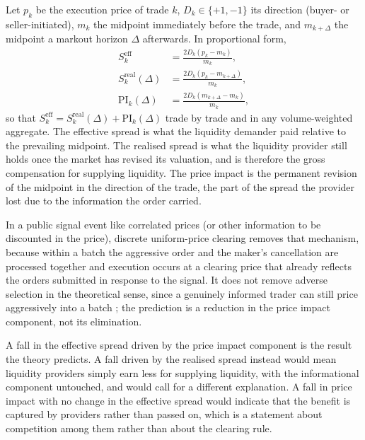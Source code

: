 Let $p_k$ be the execution price of trade $k$, $D_k \in \{+1,-1\}$ its
direction (buyer- or seller-initiated), $m_k$ the midpoint immediately
before the trade, and $m_{k+\Delta}$ the midpoint a markout horizon
$\Delta$ afterwards. In proportional form,
\begin{align}
  S^{\mathrm{eff}}_k &= \frac{2 D_k (p_k - m_k)}{m_k},
    \label{eq:effspread}\\[3pt]
  S^{\mathrm{real}}_k(\Delta) &= \frac{2 D_k (p_k - m_{k+\Delta})}{m_k},
    \label{eq:realspread}\\[3pt]
  \mathrm{PI}_k(\Delta) &= \frac{2 D_k (m_{k+\Delta} - m_k)}{m_k},
    \label{eq:priceimpact}
\end{align}
so that $S^{\mathrm{eff}}_k = S^{\mathrm{real}}_k(\Delta) +
\mathrm{PI}_k(\Delta)$ trade by trade and in any volume-weighted
aggregate. The effective spread is what the liquidity demander paid
relative to the prevailing midpoint. The realised spread is what the
liquidity provider still holds once the market has revised its
valuation, and is therefore the gross compensation for supplying
liquidity. The price impact is the permanent revision of the midpoint in
the direction of the trade, the part of the spread the provider lost due to
the information the order carried.



In a public signal event like correlated prices (or other information to be discounted in the price), discrete uniform-price clearing removes
that mechanism, because within a batch the aggressive order and the
maker's cancellation are processed together and execution occurs at a
clearing price that already reflects the orders submitted in response to
the signal. It does not remove adverse selection in the theoretical
sense, since a genuinely informed trader can still price aggressively
into a batch \citep{eibelshauser2022frequent}; the prediction is a
reduction in the price impact component, not its elimination.



A fall in the effective spread driven by the price impact
component is the result the theory predicts. A fall driven by the
realised spread instead would mean liquidity providers simply earn less
for supplying liquidity, with the informational component untouched, and
would call for a different explanation. A fall in price impact with no
change in the effective spread would indicate that the benefit is
captured by providers rather than passed on, which is a statement about
competition among them rather than about the clearing rule.



